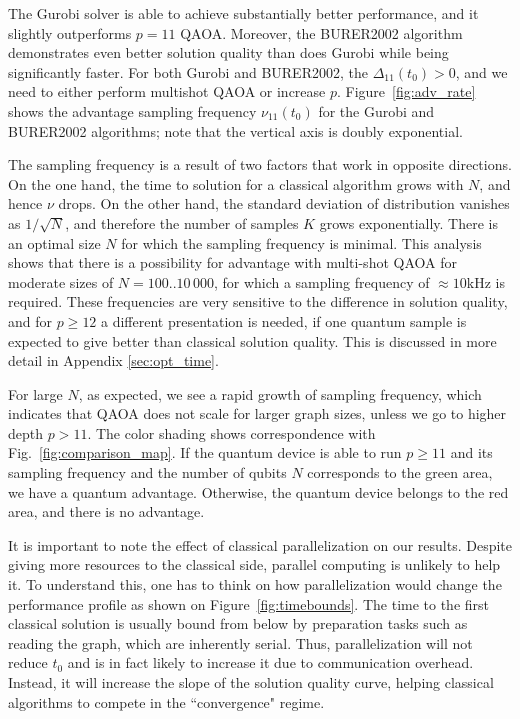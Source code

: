 The Gurobi solver is able to achieve substantially better performance, and it slightly outperforms $p=11$ QAOA. Moreover, the BURER2002 algorithm demonstrates even better solution quality than does  Gurobi while being significantly faster. For both Gurobi and BURER2002, the $\Delta_{11}(t_0) > 0$, and we need to either perform multishot QAOA or increase $p$. Figure~\ref{fig:adv_rate} shows the advantage sampling frequency $\nu_{11}(t_0)$ for the Gurobi and BURER2002 algorithms; note that the vertical axis is doubly exponential.

The sampling frequency is a result of two factors that work in opposite directions. On the one hand, the time to solution for a classical algorithm grows with $N$, and hence $\nu$ drops. On the other hand, the  standard deviation of distribution vanishes as $1/\sqrt{N}$, and therefore the number of samples $K$ grows exponentially. There is an optimal size $N$ for which the sampling frequency is minimal.
This analysis shows that there is a possibility for advantage with multi-shot QAOA for moderate sizes of $N=100..10\,000$, for which a sampling frequency of $\approx10$kHz is required.
These frequencies are very sensitive to the difference in solution quality, and for $p\geq12$ a different presentation is needed, if one quantum sample is expected to give better than classical solution quality. This is discussed in more detail in Appendix \ref{sec:opt_time}.

For large $N$, as expected, we see a rapid growth of sampling frequency, which indicates that QAOA does not scale for larger graph sizes, unless we go to higher depth $p>11$. The color shading shows correspondence with Fig.~\ref{fig:comparison_map}. If the quantum device is able to run $p \geq 11$ and its sampling frequency and the number of qubits $N$ corresponds to the green area, we have a quantum advantage. Otherwise, the quantum device belongs to the red area, and there is no advantage.

It is important to note the effect of classical parallelization on our results. Despite giving more resources to the classical side, parallel computing is unlikely to help it. To understand this, one has to think on how parallelization would change the performance profile as shown on Figure~\ref{fig:timebounds}. The time to the first classical solution is usually bound from below by preparation tasks such as reading the graph, which are inherently serial. Thus, parallelization will not reduce $t_0$ and is in fact likely to increase it due to communication overhead. Instead, it will increase the slope of the solution quality curve, helping classical algorithms to compete in the ``convergence" regime. 








